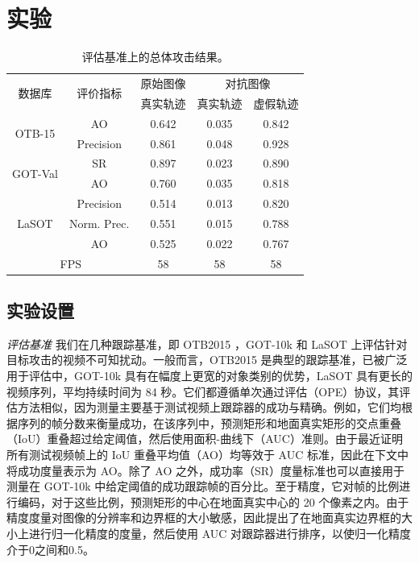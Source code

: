 \section{实验}

\begin{table}
\centering
\begin{tabular}{c c c c c}
\toprule
\multirow{2}{*}[-2pt]{数据库} & \multirow{2}{*}[-2pt]{评价指标} & 原始图像 & \multicolumn{2}{c}{对抗图像}  \\
\cmidrule(lr){3-3} \cmidrule(lr){4-5}
                          &                         & 真实轨迹 & 真实轨迹 & 虚假轨迹     \\ 
\midrule
\multirow{2}{*}{OTB-15} 
& AO   & 0.642 & 0.035 & 0.842\\
& Precision & 0.861 & 0.048 & 0.928\\
\midrule
\multirow{2}{*}{GOT-Val} 
& SR & 0.897 & 0.023 & 0.890\\
& AO 				   & 0.760 & 0.035 & 0.818 \\
\midrule
\multirow{3}{*}{LaSOT} 
& Precision       & 0.514 & 0.013 & 0.820\\
& Norm. Prec. & 0.551 & 0.015 & 0.788\\
& AO & 0.525 & 0.022 & 0.767\\
\midrule
\multicolumn{2}{c}{FPS} & 58 & 58 & 58\\
\bottomrule
\end{tabular}
\caption{评估基准上的总体攻击结果。}
\label{tab:benchmark results}
\end{table}

\subsection{实验设置}

\textit{评估基准} 我们在几种跟踪基准，即 OTB2015 \cite{OTB}，GOT-10k \cite{GOT-10k} 和 LaSOT \cite{LaSOT} 上评估针对目标攻击的视频不可知扰动。一般而言，OTB2015 是典型的跟踪基准，已被广泛用于评估中，GOT-10k 具有在幅度上更宽的对象类别的优势，LaSOT 具有更长的视频序列，平均持续时间为 84 秒。它们都遵循单次通过评估（OPE）协议，其评估方法相似，因为测量主要基于测试视频上跟踪器的成功与精确。例如，它们均根据序列的帧分数来衡量成功，在该序列中，预测矩形和地面真实矩形的交点重叠（IoU）重叠超过给定阈值，然后使用面积-曲线下（AUC）准则。由于最近证明所有测试视频帧上的 IoU 重叠平均值（AO）均等效于 AUC 标准，因此在下文中将成功度量表示为 AO。除了 AO 之外，成功率（SR）度量标准也可以直接用于测量在 GOT-10k 中给定阈值的成功跟踪帧的百分比。至于精度，它对帧的比例进行编码，对于这些比例，预测矩形的中心在地面真实中心的 20 个像素之内。由于精度度量对图像的分辨率和边界框的大小敏感，因此提出了在地面真实边界框的大小上进行归一化精度的度量，然后使用 AUC 对跟踪器进行排序，以使归一化精度介于0之间和0.5。


